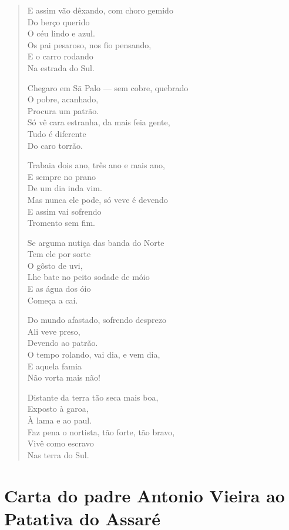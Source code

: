 \begin{verse}
E assim vão dêxando, com choro gemido\\
Do berço querido\\
O céu lindo e azul.\\
Os pai pesaroso, nos fio pensando,\\
E o carro rodando\\
Na estrada do Sul.

Chegaro em Sã Palo --- sem cobre, quebrado\\
O pobre, acanhado,\\
Procura um patrão.\\
Só vê cara estranha, da mais feia gente,\\
Tudo é diferente\\
Do caro torrão.

Trabaia dois ano, três ano e mais ano,\\
E sempre no prano\\
De um dia inda vim.\\
Mas nunca ele pode, só veve é devendo\\
E assim vai sofrendo\\
Tromento sem fim.

Se arguma nutiça das banda do Norte\\
Tem ele por sorte\\
O gôsto de uvi,\\
Lhe bate no peito sodade de móio\\
E as água dos óio\\
Começa a caí.

Do mundo afastado, sofrendo desprezo\\
Ali veve preso,\\
Devendo ao patrão.\\
O tempo rolando, vai dia, e vem dia,\\
E aquela famia\\
Não vorta mais não!

Distante da terra tão seca mais boa,\\
Exposto à garoa,\\
À lama e ao paul.\\
Faz pena o nortista, tão forte, tão bravo,\\
Vivê como escravo\\
Nas terra do Sul.
\end{verse}

\chapter{Carta do padre Antonio Vieira ao Patativa do Assaré}

